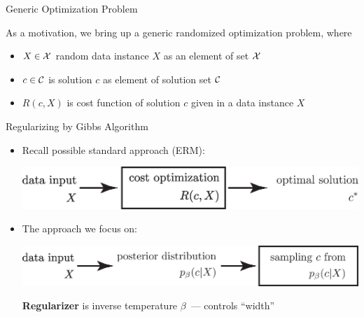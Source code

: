 \documentclass[presentation,12pt]{beamer}
\def\C{{\cal C}}
\def\X{{\cal X}}
\begin{document}
\begin{frame}{Generic Optimization Problem}
  
  As a motivation, we bring up a generic randomized optimization problem, where \\[2pt]
  \begin{itemize}
  \item $X \in \X$ random data instance $X$ as an element of set $\X$ \\[.4cm]
  \item $c \in \C$ is solution $c$ as element of solution set $\C$ \\[.4cm]
  \item $R(c, X)$ is cost function of solution $c$ given in a data instance $X$
  \end{itemize}

\end{frame}

\begin{frame}{Regularizing by Gibbs Algorithm}
\begin{itemize}
  \item<+-> Recall possible standard approach (ERM):

  \begin{center}
    \hspace{-8mm}\includegraphics[scale=.4]{standard-erm-explanation} 
  \end{center}
  

  \item<+-> The approach we focus on:

  \begin{center}
    \hspace{-8mm}\includegraphics[scale=.4]{posterior-distribution-explanation} 
  \end{center}
  
  \textbf{Regularizer} is inverse temperature $\beta$~--- controls ``width''

\end{itemize}
\end{frame}
\end{document}
